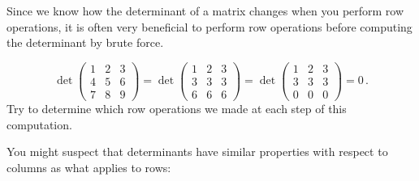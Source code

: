 
Since we know how the determinant of a matrix changes when you perform row operations, it is often very beneficial to perform row
operations before computing the determinant by brute force.

\begin{example}
\[
\det\begin{pmatrix}
1 & 2 & 3 \\
4 & 5 & 6 \\
7 & 8 & 9
\end{pmatrix}
=
\det\begin{pmatrix}
1 & 2 & 3 \\
3 & 3 & 3 \\
6 & 6 & 6 
\end{pmatrix}
=
\det\begin{pmatrix}
1 & 2 & 3 \\
3 & 3 & 3 \\
0 & 0 & 0
\end{pmatrix}=0\, .
\]
Try to determine which row operations we made at each step of this computation.
\end{example}

You might suspect that determinants have similar properties with respect to columns as what applies to rows:

\begin{center}
\end{center}

